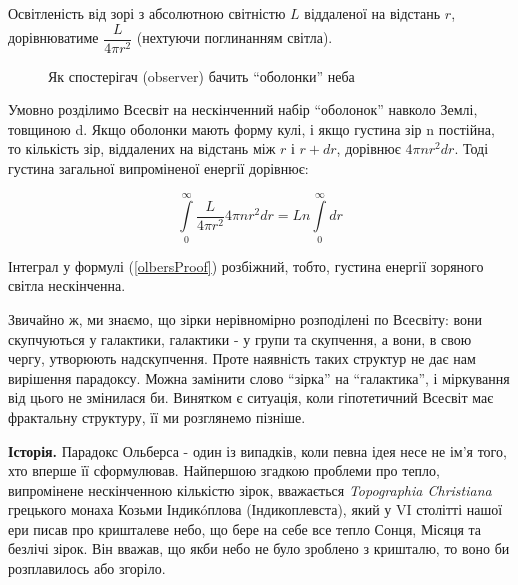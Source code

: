 \documentclass[a4paper]{article}
\begin{document}
Освітленість від зорі з абсолютною світністю $L$ віддаленої на відстань $r$, дорівнюватиме $\dfrac{L}{4{\pi}r^2}$ (нехтуючи поглинанням світла).

\begin{figure}[ht]
	\caption{Як спостерігач (observer) бачить ``оболонки'' неба}
\label{shells}
\end{figure}

Умовно розділимо Всесвіт на нескінченний набір ``оболонок'' навколо Землі, товщиною d. Якщо оболонки мають форму кулі, і якщо густина зір n постійна, то кількість зір, віддалених на відстань між $r$ і $r+dr$, дорівнює $4{\pi}nr^{2}dr$. Тоді густина загальної випроміненої енергії дорівнює:

\begin{equation}
\label{olbersProof}
\int\limits_{0}^{\infty}{\dfrac{L}{4{\pi}r^2} 4{\pi}nr^{2}dr} = Ln\int\limits_{0}^{\infty}dr
\end{equation}

Інтеграл у формулі (\ref{olbersProof}) розбіжний, тобто, густина енергії зоряного світла нескінченна.

Звичайно ж, ми знаємо, що зірки нерівномірно розподілені по Всесвіту: вони скупчуються у галактики, галактики - у групи та скупчення, а вони, в свою чергу, утворюють надскупчення. Проте наявність таких структур не дає нам вирішення парадоксу. Можна замінити слово ``зірка'' на ``галактика'', і міркування від цього не змінилася би. \cite{introduction} Винятком є ситуація, коли гіпотетичний Всесвіт має фрактальну структуру, її ми розглянемо пізніше.

\textbf{Історія.}
Парадокс Ольберса - один із випадків, коли певна ідея несе не ім'я того, хто вперше її сформулював. Найпершою згадкою проблеми про тепло, випромінене нескінченною кількістю зірок, вважається \textit{Topographia Christiana} грецького монаха Козьми Індик\'oплова (Індикоплевста), який у VI столітті нашої ери писав про кришталеве небо, що бере на себе все тепло Сонця, Місяця та безлічі зірок. Він вважав, що якби небо не було зроблено з кришталю, то воно би розплавилось або згоріло. \cite{essential} 
\end{document}
